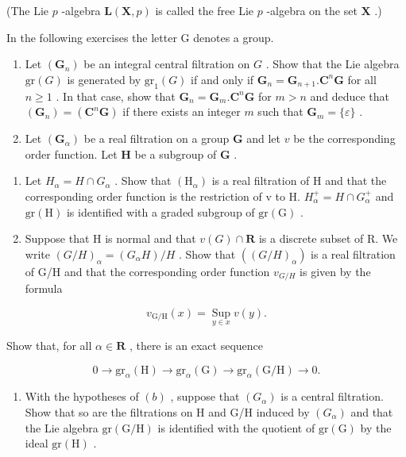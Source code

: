 (The Lie \(p\) -algebra \(\mathbf{L}(\mathbf{X}, p)\) is called the free Lie \(p\) -algebra on the set \(\mathbf{X}\) .)


In the following exercises the letter G denotes a group.

\begin{enumerate}
\def\labelenumi{\arabic{enumi}.}
\item
  Let \((\mathbf{G}_n)\) be an integral central filtration on \(G\) . Show that the Lie algebra \(\mathrm{gr}(G)\) is generated by \(\mathrm{gr}_1(G)\) if and only if \(\mathbf{G}_n = \mathbf{G}_{n+1}.\mathbf{C}^n\mathbf{G}\) for all \(n \geqslant 1\) . In that case, show that \(\mathbf{G}_n = \mathbf{G}_m.\mathbf{C}^n\mathbf{G}\) for \(m > n\) and deduce that \((\mathbf{G}_n) = (\mathbf{C}^n\mathbf{G})\) if there exists an integer \(m\) such that \(\mathbf{G}_m = \{\varepsilon\}\) .
\item
  Let \((\mathbf{G}_{\alpha})\) be a real filtration on a group \(\mathbf{G}\) and let \(v\) be the corresponding order function. Let \(\mathbf{H}\) be a subgroup of \(\mathbf{G}\) .
\end{enumerate}

\begin{enumerate}
\def\labelenumi{(\alph{enumi})}
\item
  Let \(H_{\alpha} = H \cap G_{\alpha}\) . Show that \((\mathrm{H}_{\alpha})\) is a real filtration of H and that the corresponding order function is the restriction of v to H. \(H_{\alpha}^{+} = H \cap G_{\alpha}^{+}\) and \(\mathrm{gr}(\mathrm{H})\) is identified with a graded subgroup of \(\mathrm{gr}(\mathrm{G})\) .
\item
  Suppose that H is normal and that \(v(G) \cap \mathbf{R}\) is a discrete subset of R. We write \((G/H)_{\alpha} = (G_{\alpha}H)/H\) . Show that \(((G/H)_{\alpha})\) is a real filtration of G/H and that the corresponding order function \(v_{G/H}\) is given by the formula
\end{enumerate}

\[
v _ {\mathrm{G/H}} (x) = \operatorname * {S u p} _ {y \in x} v (y).
\]

Show that, for all \(\alpha \in \mathbf{R}\) , there is an exact sequence

\[
0 \rightarrow \mathrm{gr} _ {\alpha} (\mathrm{H}) \rightarrow \mathrm{gr} _ {\alpha} (\mathrm{G}) \rightarrow \mathrm{gr} _ {\alpha} (\mathrm{G} / \mathrm{H}) \rightarrow 0.
\]

\begin{enumerate}
\def\labelenumi{(\alph{enumi})}
\setcounter{enumi}{2}
\tightlist
\item
  With the hypotheses of \((b)\) , suppose that \((G_{\alpha})\) is a central filtration. Show that so are the filtrations on H and G/H induced by \((G_{\alpha})\) and that the Lie algebra \(\mathrm{gr}(\mathrm{G}/\mathrm{H})\) is identified with the quotient of \(\mathrm{gr}(\mathrm{G})\) by the ideal \(\mathrm{gr}(\mathrm{H})\) .
\end{enumerate}

